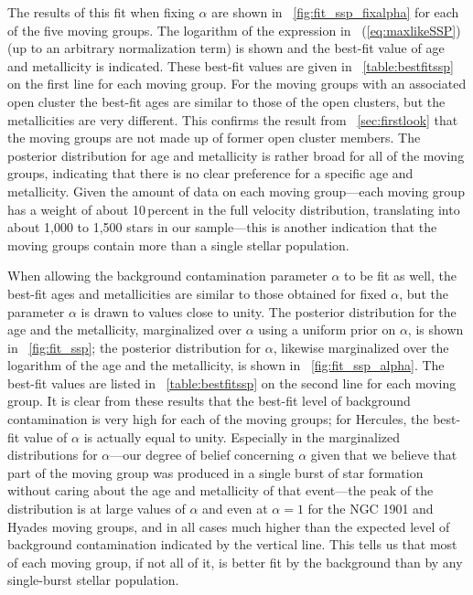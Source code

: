The results of this fit when fixing $\alpha$ are shown in
\figurename~\ref{fig:fit_ssp_fixalpha} for each of the five moving
groups. The logarithm of the expression in
\eqnname~(\ref{eq:maxlikeSSP}) (up to an arbitrary normalization term)
is shown and the best-fit value of age and metallicity is
indicated. These best-fit values are given in
\tablename~\ref{table:bestfitssp} on the first line for each moving
group. For the moving groups with an associated open cluster the
best-fit ages are similar to those of the open clusters, but the
metallicities are very different. This confirms the result from
\sectionname~\ref{sec:firstlook} that the moving groups are not made
up of former open cluster members. The posterior distribution for age
and metallicity is rather broad for all of the moving groups,
indicating that there is no clear preference for a specific age and
metallicity. Given the amount of data on each moving group---each
moving group has a weight of about 10\,percent in the full velocity
distribution, translating into about 1,000 to 1,500 stars in our
sample---this is another indication that the moving groups contain
more than a single stellar population.

When allowing the background contamination parameter $\alpha$ to be
fit as well, the best-fit ages and metallicities are similar to those
obtained for fixed $\alpha$, but the parameter $\alpha$ is drawn to
values close to unity. The posterior distribution for the age and the
metallicity, marginalized over $\alpha$ using a uniform prior on
$\alpha$, is shown in \figurename~\ref{fig:fit_ssp}; the posterior
distribution for $\alpha$, likewise marginalized over the logarithm of
the age and the metallicity, is shown in
\figurename~\ref{fig:fit_ssp_alpha}. The best-fit values are listed in
\tablename~\ref{table:bestfitssp} on the second line for each moving
group. It is clear from these results that the best-fit level of
background contamination is very high for each of the moving groups;
for Hercules, the best-fit value of $\alpha$ is actually equal to
unity. Especially in the marginalized distributions for $\alpha$---our
degree of belief concerning $\alpha$ given that we believe that part
of the moving group was produced in a single burst of star formation
without caring about the age and metallicity of that event---the peak
of the distribution is at large values of $\alpha$ and even at $\alpha
= 1$ for the NGC 1901 and Hyades moving groups, and in all cases much
higher than the expected level of background contamination indicated
by the vertical line. This tells us that most of each moving group, if
not all of it, is better fit by the background than by any
single-burst stellar population.

